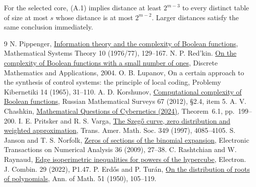 \documentclass[11pt]{article}
\begin{document}
For the selected core, (A.1) implies distance at least $2^{m-3}$ to every distinct table of size at most $s$ whose distance is at most $2^{m-2}$. Larger distances satisfy the same conclusion immediately.
\begin{thebibliography}{9}
 N. Pippenger, \href{https://doi.org/10.1007/BF01683269}{Information theory and the complexity of Boolean functions}, Mathematical Systems Theory 10 (1976/77), 129--167.
 N. P. Red'kin. \href{https://www.mathnet.ru/eng/dm172}{On the complexity of Boolean functions with a small number of ones}, Discrete Mathematics and Applications, 2004.
 O. B. Lupanov, On a certain approach to the synthesis of control systems: the principle of local coding, Problemy Kibernetiki 14 (1965), 31--110.
 A. D. Korshunov, \href{https://www.mathnet.ru/links/7cc2cdffddc9c901d3badd138b575bb5/rm9459_eng.pdf}{Computational complexity of Boolean functions}, Russian Mathematical Surveys 67 (2012), \S2.4, item 5.
 A. V. Chashkin, \href{https://keldysh.ru/papers/2024/mvk/mvk2024_152.pdf}{Mathematical Questions of Cybernetics (2024)}, Theorem~6.1, pp.~199--200.
 I. E. Pritsker and R. S. Varga, \href{https://math.okstate.edu/people/igor/96a.pdf}{The Szeg\H{o} curve, zero distribution and weighted approximation}, Trans. Amer. Math. Soc. 349 (1997), 4085--4105.
 S. Janson and T. S. Norfolk, \href{https://arxiv.org/abs/0903.3866}{Zeros of sections of the binomial expansion}, Electronic Transactions on Numerical Analysis 36 (2009), 27--38.
 C. Rashtchian and W. Raynaud, \href{https://arxiv.org/abs/1909.10435}{Edge isoperimetric inequalities for powers of the hypercube}, Electron. J. Combin. 29 (2022), P1.47.
 P. Erd\H{o}s and P. Tur\'an, \href{https://renyi.hu/~p_erdos/1950-08.pdf}{On the distribution of roots of polynomials}, Ann. of Math. 51 (1950), 105--119.
\end{thebibliography}
\end{document}
